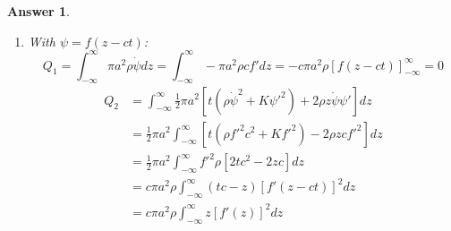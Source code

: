 \documentclass[a4paper]{article}
\newtheorem{ans}{Answer}[section]
\theoremstyle{new}
\begin{document}
\begin{ans}
\begin{enumerate}[label=(\alph*)]
$$\psi(z,t)\rightarrow\psi((1+\varepsilon)z,(1+\varepsilon)t)=\psi(z,t)+\varepsilon t\dot{\psi}+\varepsilon z\psi'\implies\delta\psi=\varepsilon(t\dot{\psi}+z\psi')$$
Since $\mathcal{L}$ is quadratic in the derivatives of $\psi$, we must have $\mathcal{L}(z,t)\rightarrow b^2\mathcal{L}(bz,bt)$. Under a change of dummy variables, $Z=bz$, $T=bt$, we can show that the action is invariant, i.e. $S(z,t)\rightarrow S(bz,bt)=\int\mathcal{L}(bz,bt)d(bz)d(bt)=S(Z,T)$. The variation in Lagrangian is
\begin{align}
    \delta\mathcal{L}&=\frac{\partial\mathcal{L}}{\partial\dot{\psi}}\delta\dot{\psi}+\frac{\partial\mathcal{L}}{\partial\psi'}\delta\psi'+\frac{\partial\mathcal{L}}{\partial\psi}\delta\psi\nonumber\\&=\pi a^2\rho\dot{\psi}\delta\dot{\psi}-\pi a^2K\psi'\delta\psi'\nonumber\\&=\pi a^2\rho\dot{\psi}\varepsilon(\dot{\psi}+t\ddot{\psi}+z\dot{\psi}')-\pi a^2K\psi'\varepsilon(\psi'+z\psi''+t\dot{\psi}')\nonumber\\&=2\varepsilon\mathcal{L}+\varepsilon t\dot{\mathcal{L}}+\varepsilon z\mathcal{L}'\nonumber\\&=\varepsilon\frac{d}{dt}(t\mathcal{L})+\varepsilon\frac{d}{dz}(z\mathcal{L})\nonumber
\end{align}
From the previous part, the LHS is $\partial_\mu(\frac{\partial\mathcal{L}}{\partial(\partial_\mu\psi)}\delta\psi)$. The conserved charge is then
\begin{align}
    Q_2&=\int\frac{\partial\mathcal{L}}{\partial\dot{\psi}}\delta\psi-\varepsilon t\mathcal{L}dz\nonumber\\&=\int\pi a^2\rho\dot{\psi}\varepsilon(t\dot{\psi}+z\psi')-\varepsilon t\frac{1}{2}(\pi a^2\rho\dot{\psi}^2-\pi a^2K\psi'^2)dz\nonumber\\&=\int\frac{1}{2}\pi a^2\rho\dot{\psi}^2\varepsilon t+\frac{1}{2}\pi a^2K\psi'^2\varepsilon t+\varepsilon \pi a^2\rho z\dot{\psi}\psi'dz\nonumber\\&=\int\frac{1}{2}\pi a^2\varepsilon[t(\rho\dot{\psi}^2+K\psi'^2)+2\rho z\dot{\psi}\psi']dz\nonumber
\end{align}
\item With $\psi=f(z-ct)$:
$$Q_1=\int_{-\infty}^\infty\pi a^2\rho\dot{\psi}dz=\int_{-\infty}^\infty -\pi a^2\rho cf'dz=-c\pi a^2\rho[f(z-ct)]_{-\infty}^\infty =0$$
\begin{align}
    Q_2&=\int_{-\infty}^\infty\frac{1}{2}\pi a^2[t(\rho\dot{\psi}^2+K\psi'^2)+2\rho z\dot{\psi}\psi']dz\nonumber\\&=\frac{1}{2}\pi a^2\int_{-\infty}^\infty [t(\rho f'^2c^2+Kf'^2)-2\rho z cf'^2]dz\nonumber\\&=\frac{1}{2}\pi a^2\int_{-\infty}^\infty f'^2\rho[2tc^2-2zc]dz\nonumber\\&=c\pi a^2\rho\int_{-\infty}^\infty (tc-z)[f'(z-ct)]^2dz\nonumber\\&=c\pi a^2\rho\int_{-\infty}^\infty z[f'(z)]^2dz\nonumber

\end{align}
\end{enumerate}
\end{ans}
\end{document}
